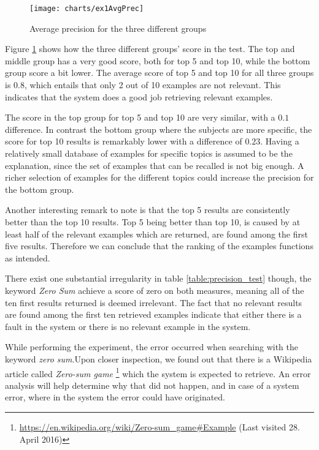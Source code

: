 \begin{figure}[H] 
\caption{Average precision for the three different groups}
\texttt{[image: charts/ex1AvgPrec]}
\label{fig:ex1AvgPrec}
\end{figure}

Figure \ref{fig:ex1AvgPrec} shows how the three different groups' score in the test. The top and middle group has a very good score, both for top 5 and top 10, while the bottom group score a bit lower. The average score of top 5 and top 10 for all three groups is \(0.8\), which entails that only 2 out of 10 examples are not relevant. This indicates that the system does a good job retrieving relevant examples.

The score in the top group for top 5 and top 10 are very similar, with a \(0.1\) difference. In contrast the bottom group where the subjects are more specific, the score for top 10 results is remarkably lower with a difference of \(0.23\). Having a relatively small database of examples for specific topics is assumed to be the explanation, since the set of examples that can be recalled is not big enough. A richer selection of examples for the different topics could increase the precision for the bottom group. 

Another interesting remark to note is that the top 5 results are consistently better than the top 10 results. Top 5 being better than top 10, is caused by at least half of the relevant examples which are returned, are found among the first five results. Therefore we can conclude that the ranking of the examples functions as intended. 

There exist one substantial irregularity in table \ref{table:precision_test} though, the keyword \textit{Zero Sum} achieve a score of zero on both measures, meaning all of the ten first results returned is deemed irrelevant. The fact that no relevant results are found among the first ten retrieved examples indicate that either there is a fault in the system or there is no relevant example in the system.

While performing the experiment, the error occurred when searching with the keyword \textit{zero sum}.Upon closer inspection, we found out that there is a Wikipedia article called \textit{Zero-sum game} \footnote{\url{https://en.wikipedia.org/wiki/Zero-sum\_game\#Example} (Last visited 28. April 2016)} which the system is expected to retrieve. An error analysis will help determine why that did not happen, and in case of a system error, where in the system the error could have originated. 

